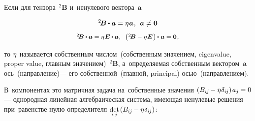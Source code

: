 \begin{otherlanguage}{russian}

Если для тензора~${^2\!\bm{B}}$ и~ненулевого вектора~${\bm{a}}$

\nopagebreak\vspace{-0.24em}\begin{equation}\label{eigenvalues:eq}
^2\!\bm{B} \dotp \bm{a} = \eigenvalue \bm{a} \hspace{.1ex} ,
\:\:
\bm{a} \neq \bm{0}
\end{equation}
\vspace{-1.33em}\[
\scalebox{0.92}[0.92]{${^2\!\bm{B}} \dotp \bm{a} = \eigenvalue \UnitDyad \dotp \bm{a} \hspace{.1ex},\;\;
\left(\hspace{.1ex}
{^2\!\bm{B} - \eigenvalue \UnitDyad}
\hspace{.2ex}\right) \hspace{-0.1ex} \dotp \hspace{.1ex} \bm{a} = \bm{0}$} \hspace{.1ex},
\]

\vspace{-0.64em} \noindent то $\eta\hspace{.1ex}$ называется собственным числом~(собственным значением, eigenvalue, proper value, главным значением)~${^2\!\bm{B}}$, а~определяемая собственным вектором~$\bm{a}$ ось~(направление)\:--- его собственной~(главной, principal) осью~(направлением).

В~компонентах это матричная задача на~собственные значения ${( B_{i\hspace{-0.1ex}j} \hspace{-0.12ex} - \eta\hspace{.1ex} \delta_{i\hspace{-0.1ex}j} ) \hspace{.25ex} a_j \hspace{-0.1ex} = 0}$\:--- однородная линейная алгебраическая система, имеющая ненулевые решения при~равенстве нулю определителя ${\smash{\underset{\raisebox{.15em}{\scalebox{0.7}{$i$,$\hspace{.15ex}j$}}}{\operatorname{det}}} \hspace{.32ex} ( B_{i\hspace{-0.1ex}j} \hspace{-0.12ex} - \eigenvalue \delta_{i\hspace{-0.1ex}j} )}$:


\end{otherlanguage}
